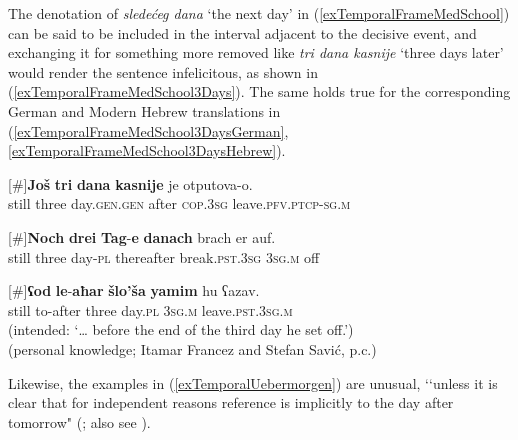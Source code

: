 The denotation of \textit{sledećeg dana} \lq the next day\rq{ }in (\ref{exTemporalFrameMedSchool}) can be said to be included in the interval adjacent to the decisive event, and exchanging it for something more removed like \textit{tri dana kasnije} \lq three days later' would render the sentence infelicitous, as shown in (\ref{exTemporalFrameMedSchool3Days}). The same holds true for the corresponding German and Modern Hebrew translations in (\ref{exTemporalFrameMedSchool3DaysGerman}, \ref{exTemporalFrameMedSchool3DaysHebrew}).

\begin{exe}
	\ex
	\begin{xlist}
	\exi{}[\#]{\gll  \textbf{Još} \textbf{tri} \textbf{dana} \textbf{kasnije} je otputova-o.\\
	 { }still three day.\textsc{gen}.\textsc{gen} after \textsc{cop}.3\textsc{sg} leave.\textsc{pfv}.\textsc{ptcp}-\textsc{sg}.\textsc{m}\\}
	 
	\exi{}[\#]{\gll \textbf{Noch} \textbf{drei} \textbf{Tag}-\textbf{e} \textbf{danach} brach er auf.\\
	still three day-\textsc{pl} thereafter break.\textsc{pst}.3\textsc{sg} 3\textsc{sg}.\textsc{m} off\\}
	
	\exi{}[\#]{\gll \textbf{ʕod} \textbf{le}-\textbf{aħar} \textbf{šlo\rq{}ša} \textbf{yamim} hu ʕazav.\\
	still to-after three day.\textsc{pl}  3\textsc{sg}.\textsc{m} leave.\textsc{pst}.3\textsc{sg}.\textsc{m}\\
	 \glt (intended: \lq … before the end of the third day he set off.\rq{}) 
	\\(personal knowledge; Itamar Francez and Stefan Savić, p.c.)}
	\end{xlist}
\end{exe}

Likewise, the examples in (\ref{exTemporalUebermorgen}) are unusual, \lq\lq unless it is clear that for independent reasons reference is implicitly to the day after tomorrow" (\cite[202]{Loebner1989}; also see \cite[266]{Boguslavsky1996}).

